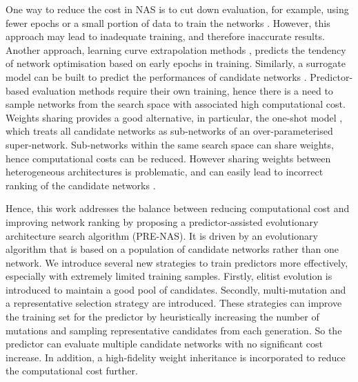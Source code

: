 \documentclass[sigconf]{acmart}
\begin{document}
One way to reduce the cost in NAS is to cut down evaluation, for example, using fewer epochs or a small portion of data to train the networks \cite{Ref:48,Ref:21,Ref:08}.  However, this approach may lead to inadequate training, and therefore inaccurate results. Another approach, learning curve extrapolation methods \cite{Ref:12,Ref:26}, predicts the tendency of network optimisation based on early epochs in training.  Similarly, a surrogate model can be built to predict the performances of candidate networks \cite{Ref:40}.  Predictor-based evaluation methods require their own training, hence there is a need to sample networks from the search space with associated high computational cost.  Weights sharing provides a good alternative, in particular, the one-shot model \cite{Ref:15,Ref:17,Ref:10}, which treats all candidate networks as sub-networks of an over-parameterised super-network.  Sub-networks within the same search space can share weights, hence computational costs can be reduced.  However sharing weights between heterogeneous architectures is problematic, and can easily lead to incorrect ranking of the candidate networks \cite{Ref:49,Ref:50}.



Hence, this work addresses the balance between reducing computational cost and improving network ranking by proposing a predictor-assisted evolutionary architecture search algorithm (PRE-NAS).  It is driven by an evolutionary algorithm that is based on a population of candidate networks rather than one network. We introduce several new strategies to train predictors more effectively, especially with extremely limited training samples.  Firstly, elitist evolution is introduced to maintain a good pool of candidates.  Secondly, multi-mutation and a representative selection strategy are introduced.  These strategies can improve the training set for the predictor by heuristically increasing the number of mutations and sampling representative candidates from each generation. So the predictor can evaluate multiple candidate networks with no significant cost increase.  In addition, a high-fidelity weight inheritance is incorporated to reduce the computational cost further. 
\end{document}
